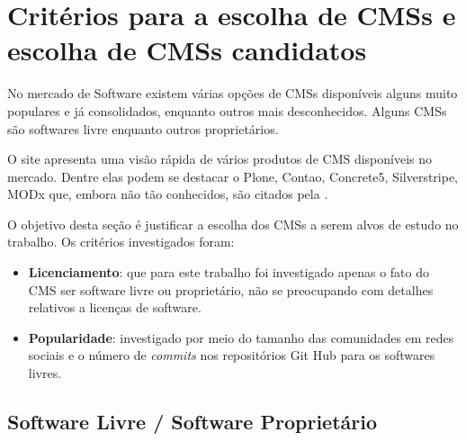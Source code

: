 % 
% 
% 

\section{Critérios para a escolha de CMSs e escolha de CMSs candidatos}
\label{CMSs_candidatos}
No mercado de Software existem várias opções de CMSs disponíveis alguns muito populares e já consolidados, enquanto outros mais desconhecidos. Alguns CMSs são softwares livre enquanto outros proprietários.

O site    apresenta uma visão rápida de vários produtos de CMS disponíveis no mercado. Dentre elas podem se destacar o Plone, Contao, Concrete5, Silverstripe, MODx que, embora não tão conhecidos, são citados pela \cite{Vision}.

O objetivo desta seção é justificar a escolha dos CMSs a serem alvos de estudo no trabalho. Os critérios investigados foram:

\begin{itemize}
\item \textbf{Licenciamento}: que para este trabalho foi investigado apenas o fato do CMS ser software livre ou proprietário, não se preocupando com detalhes relativos a licenças de software.
\item \textbf{Popularidade}: investigado por meio do tamanho das comunidades em redes sociais e o número de \textit{commits} nos repositórios Git Hub para os softwares livres.
\end{itemize}

\subsection{Software Livre / Software Proprietário}
\label{free_software}

